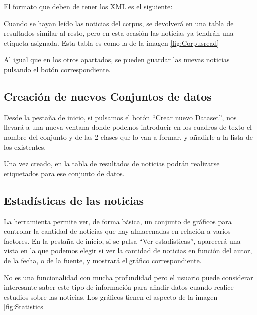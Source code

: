 
El formato que deben de tener los XML es el siguiente:


Cuando se hayan leído las noticias del corpus, se devolverá en una tabla de resultados similar al resto, pero en esta ocasión las noticias ya tendrán una etiqueta asignada. Esta tabla es como la de la imagen \ref{fig:Corpusread}


Al igual que en los otros apartados, se pueden guardar las nuevas noticias pulsando el botón correspondiente.

\subsection{Creación de nuevos Conjuntos de datos}

Desde la pestaña de inicio, si pulsamos el botón ``Crear nuevo Dataset'', nos llevará a una nueva ventana donde podemos introducir en los cuadros de texto el nombre del conjunto y de las 2 clases que lo van a formar, y añadirle a la lista de los existentes.


Una vez creado, en la tabla de resultados de noticias podrán realizarse etiquetados para ese conjunto de datos.

\subsection{Estadísticas de las noticias}

La herramienta permite ver, de forma básica, un conjunto de gráficos para controlar la cantidad de noticias que hay almacenadas en relación a varios factores. En la pestaña de inicio, si se pulsa ``Ver estadísticas'', aparecerá una vista en la que podemos elegir si ver la cantidad de noticias en función del autor, de la fecha, o de la fuente, y mostrará el gráfico correspondiente.

No es una funcionalidad con mucha profundidad pero el usuario puede considerar interesante saber este tipo de información para añadir datos cuando realice estudios sobre las noticias. Los gráficos tienen el aspecto de la imagen \ref{fig:Statistics}


